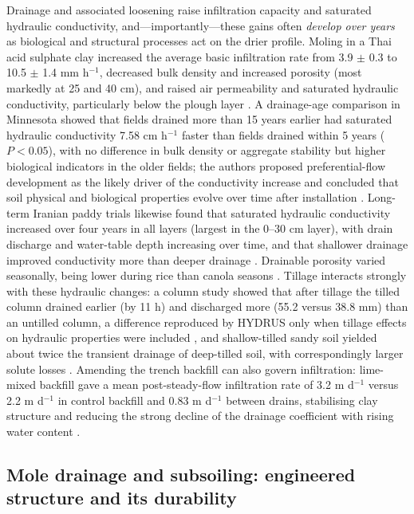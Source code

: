 Drainage and associated loosening raise infiltration capacity and saturated hydraulic
conductivity, and---importantly---these gains often \emph{develop over years} as
biological and structural processes act on the drier profile. Moling in a Thai acid
sulphate clay increased the average basic infiltration rate from 3.9 $\pm$ 0.3 to
10.5 $\pm$ 1.4 mm h$^{-1}$, decreased bulk density and increased porosity (most
markedly at 25 and 40 cm), and raised air permeability and saturated hydraulic
conductivity, particularly below the plough layer \parencite{JHA1995}. A drainage-age
comparison in Minnesota showed that fields drained more than 15 years earlier had
saturated hydraulic conductivity 7.58 cm h$^{-1}$ faster than fields drained within 5
years ($P < 0.05$), with no difference in bulk density or aggregate stability but
higher biological indicators in the older fields; the authors proposed
preferential-flow development as the likely driver of the conductivity increase and
concluded that soil physical and biological properties evolve over time after
installation \parencite{Frankl2023}. Long-term Iranian paddy trials likewise found
that saturated hydraulic conductivity increased over four years in all layers (largest
in the 0--30 cm layer), with drain discharge and water-table depth increasing over
time, and that shallower drainage improved conductivity more than deeper drainage
\parencite{JafariTalukolaee2016,Talukolaee2018}. Drainable porosity varied seasonally,
being lower during rice than canola seasons \parencite{Talukolaee2018}. Tillage
interacts strongly with these hydraulic changes: a column study showed that after
tillage the tilled column drained earlier (by 11 h) and discharged more (55.2 versus
38.8 mm) than an untilled column, a difference reproduced by HYDRUS only when
tillage effects on hydraulic properties were included \parencite{Moroizumi2004}, and
shallow-tilled sandy soil yielded about twice the transient drainage of deep-tilled
soil, with correspondingly larger solute losses \parencite{MANSELL1980}. Amending the
trench backfill can also govern infiltration: lime-mixed backfill gave a mean
post-steady-flow infiltration rate of 3.2 m d$^{-1}$ versus 2.2 m d$^{-1}$ in control
backfill and 0.83 m d$^{-1}$ between drains, stabilising clay structure and reducing
the strong decline of the drainage coefficient with rising water content
\parencite{Saulys2006}.

\subsection{Mole drainage and subsoiling: engineered structure and its durability}

